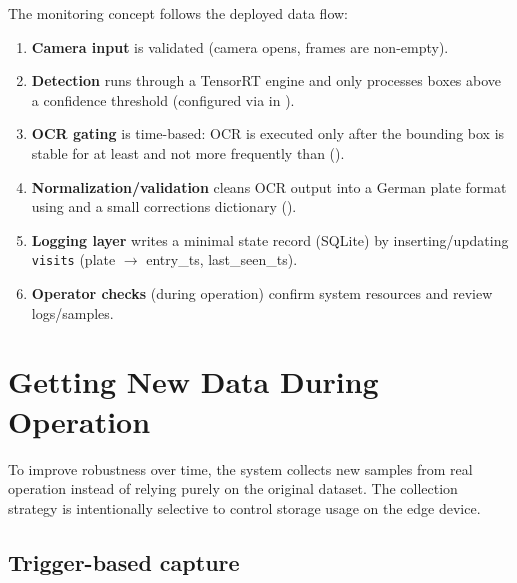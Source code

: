 \noindent
The monitoring concept follows the deployed data flow:
	\begin{enumerate}
		\item \textbf{Camera input} is validated (camera opens, frames are non-empty).
		\item \textbf{Detection} runs through a TensorRT engine and only processes boxes above a confidence threshold (configured via  in\linebreak
		).
		\item \textbf{OCR gating} is time-based: OCR is executed only after the bounding box is stable for at least  and not more frequently than  ().
		\item \textbf{Normalization/validation} cleans OCR output into a German plate format using  and a small corrections dictionary ().
		\item \textbf{Logging layer} writes a minimal state record (SQLite) by inserting/updating \texttt{visits} (plate $\rightarrow$ entry\_ts, last\_seen\_ts).
		\item \textbf{Operator checks} (during operation) confirm system resources and review logs/samples.
	\end{enumerate}

\section{Getting New Data During Operation}

\noindent
To improve robustness over time, the system collects new samples from real operation instead of relying purely on the original dataset.
The collection strategy is intentionally selective to control storage usage on the edge device.

\subsection{Trigger-based capture}

